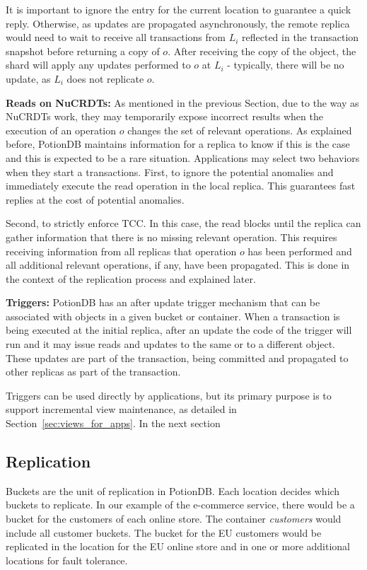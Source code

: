 \documentclass[sigconf, nonacm]{acmart}
\begin{document}
It is important to ignore the entry for the current location to guarantee a quick reply. 
Otherwise, as updates are propagated asynchronously, the remote replica would need to wait to 
receive all transactions from $L_i$ reflected in the transaction snapshot before returning a copy
of $o$.
After receiving the copy of the object, the shard will apply any updates performed to $o$ at $L_i$ - typically,
there will be no update, as $L_i$ does not replicate $o$.

\noindent
\textbf{Reads on NuCRDTs:}
As mentioned in the previous Section, due to the way as NuCRDTs work, they may temporarily expose 
incorrect results when the execution of an operation $o$ changes the set of relevant operations.  
As explained before, PotionDB maintains information for a replica to know if this is the case and
this is expected to be a rare situation. 
Applications may select two behaviors when they start a transactions.
First, to ignore the potential anomalies and immediately execute the read operation in the local replica.
This guarantees fast replies at the cost of potential anomalies. 

Second, to strictly enforce TCC. In this case, the read blocks until the replica can gather 
information that there is no missing relevant operation. This requires receiving information from
all replicas that operation $o$ has been performed and all additional relevant operations, if any, have been
propagated. This is done in the context of the replication process and explained later.

\noindent
\textbf{Triggers:}
PotionDB has an after update trigger mechanism that can be associated with 
objects in a given bucket or container.
When a transaction is being executed at the initial replica, after an update the code
of the trigger will run and it may issue reads and updates to the same or to a different object.
These updates are part of the transaction, being committed and propagated to other replicas
as part of the transaction.

Triggers can be used directly by applications, but its primary purpose is to support
incremental view maintenance, as detailed in Section~\ref{sec:views_for_apps}.
In the next section

\subsection{Replication}
\label{sec:replication}

Buckets are the unit of replication in PotionDB.  Each location decides which buckets to replicate.
In our example of the e-commerce service, there would be a bucket for 
the customers of each online store.  The container \emph{customers} would include all customer buckets.
The bucket for the EU customers would be replicated in the location for the EU online store and
in one or more additional locations for fault tolerance.
\end{document}
